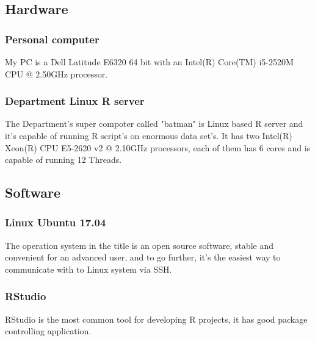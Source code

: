 		\subsection{Hardware}
			\subsubsection{Personal computer}
My PC is a Dell Latitude E6320 64 bit with an Intel(R) Core(TM) i5-2520M CPU @ 2.50GHz processor.
\cite{Latitude}
			\subsubsection{Department Linux R server}
The Department's super compoter called "batman" is Linux based R server and it's capable of running R script's on enormous data set's. It has two Intel(R) Xeon(R) CPU E5-2620 v2 @ 2.10GHz processors, each of them has 6 cores and is capable of running 12 Threads.
\cite{Batman}
		\subsection{Software}
			\subsubsection{Linux Ubuntu 17.04}
The operation system in the title is an open source software, stable and convenient for an advanced user, and to go further, it's the easiest way to communicate with to Linux system via SSH.
\cite{Ubuntu}
			\subsubsection{RStudio}
RStudio is the most common tool for developing R projects, it has good package controlling application.
\cite{RStudio}

